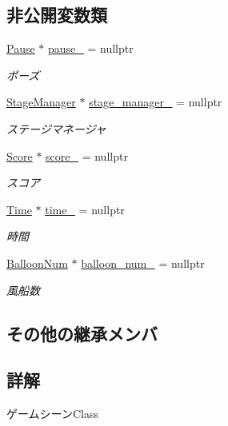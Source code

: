 \subsection*{非公開変数類}
\begin{DoxyCompactItemize}
\item 
\mbox{\hyperlink{class_pause}{Pause}} $\ast$ \mbox{\hyperlink{class_game_scene_a998ade349a8d24fbeaea63d3455c6954}{pause\+\_\+}} = nullptr
\begin{DoxyCompactList}\small\item\em ポーズ \end{DoxyCompactList}\item 
\mbox{\hyperlink{class_stage_manager}{Stage\+Manager}} $\ast$ \mbox{\hyperlink{class_game_scene_a9644e90afff130771cafa10d28206c43}{stage\+\_\+manager\+\_\+}} = nullptr
\begin{DoxyCompactList}\small\item\em ステージマネージャ \end{DoxyCompactList}\item 
\mbox{\hyperlink{class_score}{Score}} $\ast$ \mbox{\hyperlink{class_game_scene_ab1fde2d9a04eb791457a7fc8ec11a99d}{score\+\_\+}} = nullptr
\begin{DoxyCompactList}\small\item\em スコア \end{DoxyCompactList}\item 
\mbox{\hyperlink{class_time}{Time}} $\ast$ \mbox{\hyperlink{class_game_scene_a9bb839a4c2d00698292efd6d029e9c8e}{time\+\_\+}} = nullptr
\begin{DoxyCompactList}\small\item\em 時間 \end{DoxyCompactList}\item 
\mbox{\hyperlink{class_balloon_num}{Balloon\+Num}} $\ast$ \mbox{\hyperlink{class_game_scene_a721bf927c3a3953fbe6333aea1718c3b}{balloon\+\_\+num\+\_\+}} = nullptr
\begin{DoxyCompactList}\small\item\em 風船数 \end{DoxyCompactList}\end{DoxyCompactItemize}
\subsection*{その他の継承メンバ}


\subsection{詳解}
ゲームシーン\+Class 

